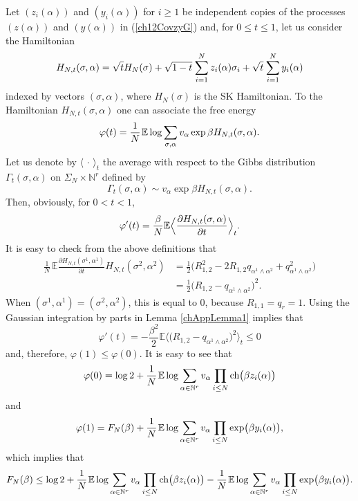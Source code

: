 \documentclass[12pt]{article}
\newcommand{\ch}{{\mbox{\rm ch}}}
\newcommand{\smsp}{\hspace{0.3mm}}
\newcommand{\e}{\mathbb{E}}
\newcommand{\Natural}{\mathbb{N}}
\newcommand{\la}{\langle}
\newcommand{\ra}{\rangle}
\theoremstyle{nonumberplain}
\begin{document}
Let  $(z_i(\alpha))$ and $(y_i(\alpha))$ for $i\geq 1$ be independent copies of the processes $(z(\alpha))$ and $(y(\alpha))$ in (\ref{ch12CovzyG}) and, for $0\leq t\leq 1$, let us consider the Hamiltonian
\begin{equation}
H_{N,t}(\sigma,\alpha) = 
\sqrt{t} H_N(\sigma) + \sqrt{1-t}\smsp \sum_{i=1}^N z_{i}(\alpha) \sigma_i 
+\sqrt{t}\smsp  \sum_{i=1}^N y_{i}(\alpha)
\label{ch33Hta}
\end{equation}
indexed by vectors $(\sigma,\alpha)$, where $H_N(\sigma)$ is the SK Hamiltonian. To the Hamiltonian $H_{N,t}(\sigma,\alpha) $ one can associate the free energy
\begin{equation}
\varphi(t)=\frac{1}{N}\smsp \e\log \sum_{\sigma,\alpha} v_{\alpha} \exp \beta H_{N, t}(\sigma,\alpha).
\label{ch33Gint}
\end{equation}
Let us denote by $\la\, \cdot\,\ra_t$ the average with respect to the Gibbs distribution $\Gamma_t(\sigma,\alpha)$ on $\Sigma_N\times \Natural^r$ defined by
$$
\Gamma_t(\sigma,\alpha) \sim v_\alpha \exp \beta H_{N, t}(\sigma,\alpha).
$$
Then, obviously, for $0<t<1$,
$$
\varphi'(t) = \frac{\beta}{N}\e \Bigl\la \frac{\partial H_{N, t}(\sigma,\alpha)}{\partial t} \Bigr\ra_t.
$$
It is easy to check from the above definitions that 
\begin{align*}
\frac{1}{N}\, \e \frac{\partial H_{N, t}(\sigma^1,\alpha^1)}{\partial t} H_{N, t}(\sigma^2,\alpha^2)
& = 
\frac{1}{2}
\bigl(
R_{1,2}^2 -2 R_{1,2} q_{\alpha^1\wedge\alpha^2} + q_{\alpha^1\wedge\alpha^2}^2
\bigr)
\\
& =
\frac{1}{2}
\bigl(
R_{1,2} - q_{\alpha^1\wedge\alpha^2} 
\bigr)^2.
\end{align*}
When $(\sigma^1,\alpha^1)=(\sigma^2,\alpha^2)$, this is equal to $0$, because $R_{1,1}=q_r = 1$. Using the 
Gaussian integration by parts in Lemma \ref{chAppLemma1} implies that
$$
\varphi'(t) = -\frac{\beta^2}{2}\e \bigl\la \bigl(
R_{1,2} - q_{\alpha^1\wedge\alpha^2} 
\bigr)^2 \bigr\ra_t \leq 0
$$
and, therefore, $\varphi(1)\leq \varphi(0).$  It is easy to see that
$$
\varphi(0)
=
\log 2 + 
\frac{1}{N}\smsp \e\log \sum_{\alpha\in\Natural^r} v_{\alpha} \prod_{i\leq N}
\ch\bigl(\beta z_{i}(\alpha) \bigr)
$$
and
$$
\varphi(1)
=
F_N(\beta)
+
\frac{1}{N}\smsp \e\log \sum_{\alpha\in\Natural^r} v_{\alpha} \prod_{i\leq N} 
\exp \bigl(\beta y_{i}(\alpha) \bigr),
$$
which implies that
$$
F_N(\beta)
\leq
\log 2 + 
\frac{1}{N}\smsp \e\log \sum_{\alpha\in\Natural^r} v_{\alpha} \prod_{i\leq N}
\ch\bigl(\beta z_{i}(\alpha) \bigr)
-
\frac{1}{N}\smsp \e\log \sum_{\alpha\in\Natural^r} v_{\alpha} \prod_{i\leq N} 
\exp \bigl(\beta y_{i}(\alpha) \bigr).
$$
\end{document}
